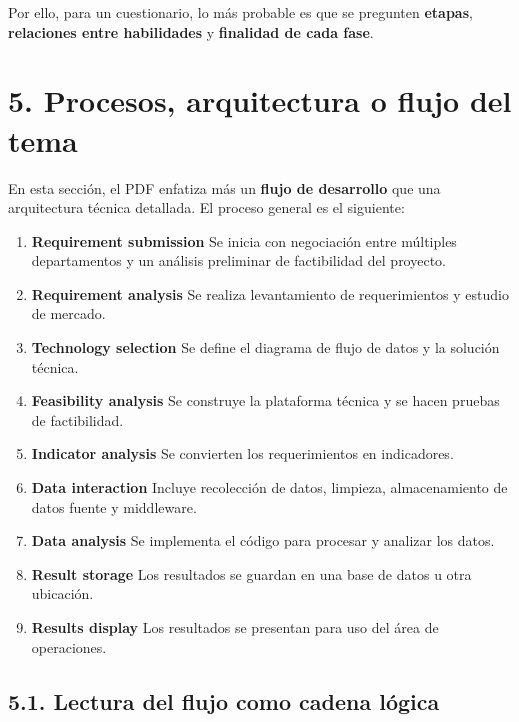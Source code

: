 \documentclass[8pt,a4paper,twocolumn]{article}
\begin{document}
Por ello, para un cuestionario, lo más probable es que se pregunten \textbf{etapas}, \textbf{relaciones entre habilidades} y \textbf{finalidad de cada fase}.

\section*{5. Procesos, arquitectura o flujo del tema}

En esta sección, el PDF enfatiza más un \textbf{flujo de desarrollo} que una arquitectura técnica detallada. El proceso general es el siguiente:

\begin{enumerate}[leftmargin=*]
    \item \textbf{Requirement submission}  
    Se inicia con negociación entre múltiples departamentos y un análisis preliminar de factibilidad del proyecto.
    
    \item \textbf{Requirement analysis}  
    Se realiza levantamiento de requerimientos y estudio de mercado.
    
    \item \textbf{Technology selection}  
    Se define el diagrama de flujo de datos y la solución técnica.
    
    \item \textbf{Feasibility analysis}  
    Se construye la plataforma técnica y se hacen pruebas de factibilidad.
    
    \item \textbf{Indicator analysis}  
    Se convierten los requerimientos en indicadores.
    
    \item \textbf{Data interaction}  
    Incluye recolección de datos, limpieza, almacenamiento de datos fuente y middleware.
    
    \item \textbf{Data analysis}  
    Se implementa el código para procesar y analizar los datos.
    
    \item \textbf{Result storage}  
    Los resultados se guardan en una base de datos u otra ubicación.
    
    \item \textbf{Results display}  
    Los resultados se presentan para uso del área de operaciones.
\end{enumerate}

\subsection*{5.1. Lectura del flujo como cadena lógica}
\end{document}
